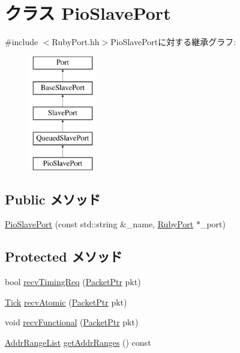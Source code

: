 \hypertarget{classRubyPort_1_1PioSlavePort}{
\section{クラス PioSlavePort}
\label{classRubyPort_1_1PioSlavePort}
}


{\ttfamily \#include $<$RubyPort.hh$>$}PioSlavePortに対する継承グラフ:\begin{figure}[H]
\begin{center}
\leavevmode
\includegraphics[height=5cm]{classRubyPort_1_1PioSlavePort}
\end{center}
\end{figure}
\subsection*{Public メソッド}
\begin{DoxyCompactItemize}
\item 
\hyperlink{classRubyPort_1_1PioSlavePort_a3677965c763257796db6fbea6765c6c5}{PioSlavePort} (const std::string \&\_\-name, \hyperlink{classRubyPort}{RubyPort} $\ast$\_\-port)
\end{DoxyCompactItemize}
\subsection*{Protected メソッド}
\begin{DoxyCompactItemize}
\item 
bool \hyperlink{classRubyPort_1_1PioSlavePort_a3344d9dd0f83257feab5424e761f31c6}{recvTimingReq} (\hyperlink{classPacket}{PacketPtr} pkt)
\item 
\hyperlink{base_2types_8hh_a5c8ed81b7d238c9083e1037ba6d61643}{Tick} \hyperlink{classRubyPort_1_1PioSlavePort_a5f0b4c4a94f6b0053f9d7a4eb9c2518a}{recvAtomic} (\hyperlink{classPacket}{PacketPtr} pkt)
\item 
void \hyperlink{classRubyPort_1_1PioSlavePort_aeefa907fb6d6a787e6dab90e8138ea90}{recvFunctional} (\hyperlink{classPacket}{PacketPtr} pkt)
\item 
\hyperlink{classstd_1_1list}{AddrRangeList} \hyperlink{classRubyPort_1_1PioSlavePort_a36cf113d5e5e091ebddb32306c098fae}{getAddrRanges} () const 
\end{DoxyCompactItemize}
